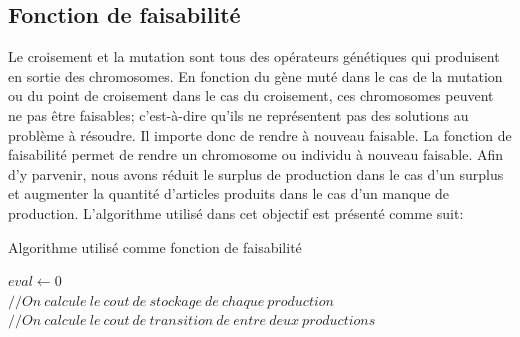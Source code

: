 \documentclass[12pt,a4paper]{article}
\begin{document}
	\subsection{Fonction de faisabilité}
	Le croisement et la mutation sont tous des opérateurs génétiques qui produisent en sortie des chromosomes. En fonction du gène muté dans le cas de la mutation ou du point de croisement dans le cas du croisement, ces chromosomes peuvent ne pas être faisables; c'est-à-dire qu'ils ne représentent pas des solutions au problème à résoudre. Il importe donc de rendre à nouveau faisable. La fonction de faisabilité permet de rendre un chromosome ou individu à nouveau faisable. Afin d'y parvenir, nous avons réduit le surplus de production dans le cas d'un surplus et augmenter la quantité d'articles produits dans le cas d'un manque de production. L'algorithme utilisé dans cet objectif est présenté comme suit: 
	\\
	\begin{algorithm}[H]
 		\caption{Algorithme utilisé comme fonction de faisabilité}
 		\label{alg:faisabilite}
 		\BlankLine
 		$eval \gets 0$\\
 		$// On\ calcule\ le\ cout\ de\ stockage\ de\ chaque\ production$ \\
 		$// On\ calcule\ le\ cout\ de\ transition\ de\ entre\ deux\ productions$ \\
	\end{algorithm}
	
\end{document}
